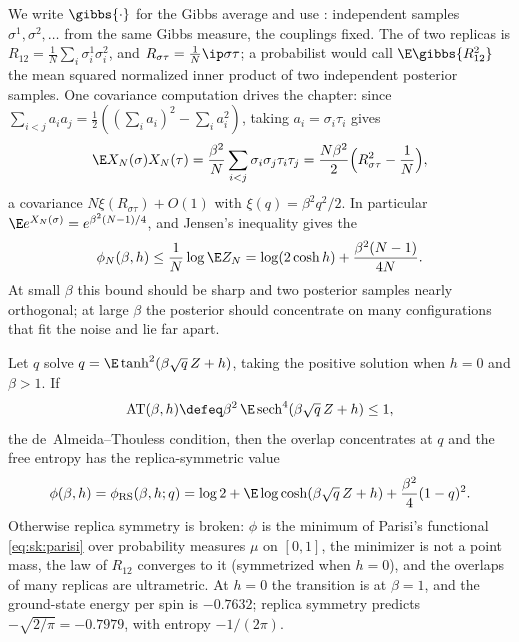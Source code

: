 \begin{refsection}
We write $\gibbs{\cdot}$ for the Gibbs average and use : independent samples $\sigma^1,\sigma^2,\dots$ from the same Gibbs measure, the couplings fixed. The  of two replicas is $R_{12}=\frac1N\sum_i\sigma^1_i\sigma^2_i$, and $R_{\sigma\tau}=\frac1N\ip\sigma\tau$; a probabilist would call $\E\gibbs{R_{12}^2}$ the mean squared normalized inner product of two independent posterior samples. One covariance computation drives the chapter: since $\sum_{i<j}a_ia_j=\frac12((\sum_ia_i)^2-\sum_ia_i^2)$, taking $a_i=\sigma_i\tau_i$ gives
\begin{equation}\label{eq:sk:cov}
\E X_N(\sigma)X_N(\tau)=\frac{\beta^2}N\sum_{i<j}\sigma_i\sigma_j\tau_i\tau_j=\frac{N\beta^2}2\Bigl(R_{\sigma\tau}^2-\frac1N\Bigr),
\end{equation}
a covariance $N\xi(R_{\sigma\tau})+O(1)$ with $\xi(q)=\beta^2q^2/2$. In particular $\E e^{X_N(\sigma)}=e^{\beta^2(N-1)/4}$, and Jensen's inequality gives the 
\begin{equation}\label{eq:sk:annealed}
\phi_N(\beta,h)\le\frac1N\log\E Z_N=\log(2\cosh h)+\frac{\beta^2(N-1)}{4N}.
\end{equation}
At small $\beta$ this bound should be sharp and two posterior samples nearly orthogonal; at large $\beta$ the posterior should concentrate on many configurations that fit the noise and lie far apart.

\begin{physicsbox}
Let $q$ solve $q=\E\tanh^2(\beta\sqrt q\,Z+h)$, taking the positive solution when $h=0$ and $\beta>1$. If
\[
\skAT(\beta,h)\defeq\beta^2\,\E\sksech^4(\beta\sqrt q\,Z+h)\le1,
\]
the de~Almeida--Thouless condition, then the overlap concentrates at $q$ and the free entropy has the replica-symmetric value
\[
\phi(\beta,h)=\skRS(\beta,h;q)=\log2+\E\log\cosh(\beta\sqrt q\,Z+h)+\frac{\beta^2}4(1-q)^2 .
\]
Otherwise replica symmetry is broken: $\phi$ is the minimum of Parisi's functional \eqref{eq:sk:parisi} over probability measures $\mu$ on $[0,1]$, the minimizer is not a point mass, the law of $R_{12}$ converges to it (symmetrized when $h=0$), and the overlaps of many replicas are ultrametric. At $h=0$ the transition is at $\beta=1$, and the ground-state energy per spin is $-0.7632$; replica symmetry predicts $-\sqrt{2/\pi}=-0.7979$, with entropy $-1/(2\pi)$.
\end{physicsbox}


\end{refsection}

